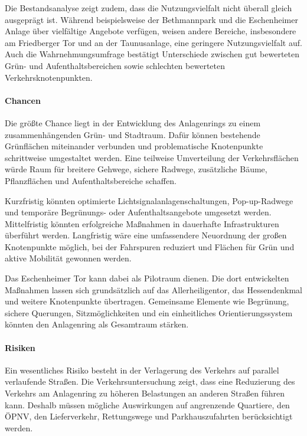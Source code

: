 \documentclass[a4paper,12pt]{article}
\begin{document}
Die Bestandsanalyse zeigt zudem, dass die Nutzungsvielfalt nicht überall gleich ausgeprägt ist. Während beispielsweise der Bethmannpark und die Eschenheimer Anlage über vielfältige Angebote verfügen, weisen andere Bereiche, insbesondere am Friedberger Tor und an der Taunusanlage, eine geringere Nutzungsvielfalt auf. Auch die Wahrnehmungsumfrage bestätigt Unterschiede zwischen gut bewerteten Grün- und Aufenthaltsbereichen sowie schlechten bewerteten Verkehrsknotenpunkten.

\paragraph{Chancen}

Die größte Chance liegt in der Entwicklung des Anlagenrings zu einem zusammenhängenden Grün- und Stadtraum. Dafür können bestehende Grünflächen miteinander verbunden und problematische Knotenpunkte schrittweise umgestaltet werden. Eine teilweise Umverteilung der Verkehrsflächen würde Raum für breitere Gehwege, sichere Radwege, zusätzliche Bäume, Pflanzflächen und Aufenthaltsbereiche schaffen.

Kurzfristig könnten optimierte Lichtsignalanlagenschaltungen, Pop-up-Radwege und temporäre Begrünungs- oder Aufenthaltsangebote umgesetzt werden. Mittelfristig könnten erfolgreiche Maßnahmen in dauerhafte Infrastrukturen überführt werden. Langfristig wäre eine umfassendere Neuordnung der großen Knotenpunkte möglich, bei der Fahrspuren reduziert und Flächen für Grün und aktive Mobilität gewonnen werden.

Das Eschenheimer Tor kann dabei als Pilotraum dienen. Die dort entwickelten Maßnahmen lassen sich grundsätzlich auf das Allerheiligentor, das Hessendenkmal und weitere Knotenpunkte übertragen. Gemeinsame Elemente wie Begrünung, sichere Querungen, Sitzmöglichkeiten und ein einheitliches Orientierungssystem könnten den Anlagenring als Gesamtraum stärken.

\paragraph{Risiken}

Ein wesentliches Risiko besteht in der Verlagerung des Verkehrs auf parallel verlaufende Straßen. Die Verkehrsuntersuchung zeigt, dass eine Reduzierung des Verkehrs am Anlagenring zu höheren Belastungen an anderen Straßen führen kann. Deshalb müssen mögliche Auswirkungen auf angrenzende Quartiere, den ÖPNV, den Lieferverkehr, Rettungswege und Parkhauszufahrten berücksichtigt werden.
\end{document}

